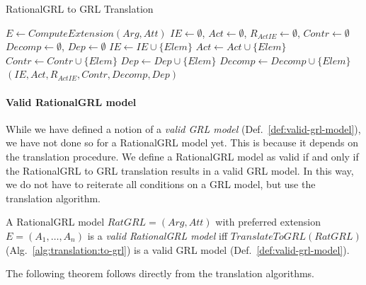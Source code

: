 \begin{algorithm}[h]
  \caption{RationalGRL to GRL Translation}
  \label{alg:translation:to-grl}
  \begin{algorithmic}[1]
    \State $E \leftarrow ComputeExtension(Arg,Att)$
    \State $IE\leftarrow\emptyset$, $Act\leftarrow\emptyset$, $R_{ActIE}\leftarrow\emptyset$, $Contr\leftarrow\emptyset$
    \State $Decomp\leftarrow\emptyset$, $Dep\leftarrow\emptyset$
    \label{alg:translation:to-grl:extension-iter}
      \label{alg:translation:to-grl:switch}
            \State $IE\leftarrow IE\cup \{Elem\}$
          \EndCase
            \State $Act\leftarrow Act \cup\{Elem\}$
          \EndCase
            \State $Contr\leftarrow Contr\cup \{Elem\}$
          \EndCase
            \State $Dep\leftarrow Dep\cup \{Elem\}$
          \EndCase
            \State $Decomp\leftarrow Decomp\cup\{Elem\}$
          \EndCase
      \EndSwitch
    \EndFor
    \State \Return $(IE,Act,R_{ActIE}, Contr, Decomp, Dep)$\label{alg:translation:to-grl:return}
    \EndProcedure
  \end{algorithmic}
\end{algorithm}

\paragraph{Valid RationalGRL model} While we have defined a notion of a \emph{valid GRL model} (Def.~\ref{def:valid-grl-model}), we have not done so for a RationalGRL model yet. This is because it depends on the translation procedure. We define a RationalGRL model as valid if and only if the RationalGRL to GRL translation results in a valid GRL model. In this way, we do not have to reiterate all conditions on a GRL model, but use the translation algorithm.

\begin{definition}
\label{def:valid-rationalgrl-model}
A RationalGRL model $RatGRL = (Arg, Att)$ with preferred extension $E=(A_1,\ldots,A_n)$ is a \emph{valid RationalGRL model} iff $TranslateToGRL(RatGRL)$ (Alg.~\ref{alg:translation:to-grl}) is a valid GRL model (Def.~\ref{def:valid-grl-model}).
\end{definition}

The following theorem follows directly from the translation algorithms.

